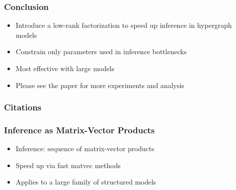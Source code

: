 \documentclass{beamer}
\begin{document}
\begin{frame}
\frametitle{Conclusion}
\begin{itemize}
\item Introduce a low-rank factorization to speed up inference in hypergraph models
\vspace{2em}
\item Constrain only parameters used in inference bottlenecks
\vspace{2em}
\item Most effective with large models
\vspace{2em}
\item Please see the paper for more experiments and analysis
\end{itemize}
\end{frame}


\begin{frame}[allowframebreaks]
\frametitle{Citations}
\printbibliography
\end{frame}






\begin{frame}
\frametitle{Inference as Matrix-Vector Products}
\begin{itemize}
\item Inference: sequence of matrix-vector products
\vspace{1em}
\item Speed up via fast matvec methods 
\vspace{1em}
\item Applies to a large family of structured models
\end{itemize}
\end{frame}

\end{document}
